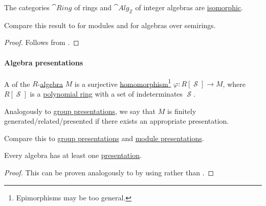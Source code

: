 \begin{proposition}\label{thm:ring_is_integer_algebra}
  The categories \( \hyperref[def:ring/category]{\cat{Ring}} \) of rings and \( \hyperref[def:algebra_over_ring/category]{\cat{Alg}_\BbbZ} \) of integer algebras are \hyperref[rem:category_similarity/isomorphism]{isomorphic}.
\end{proposition}
\begin{comments}
  \item Compare this result to  for modules and  for algebras over semirings.
\end{comments}
\begin{proof}
  Follows from .
\end{proof}

\paragraph{Algebra presentations}

\begin{definition}\label{def:algebra_presentation}
  A  of the \( R \)-\hyperref[def:algebra]{algebra} \( M \) is a surjective \hyperref[def:module/homomorphism]{homomorphism}\footnote{Epimorphisms may be too general.} \( \varphi: R[\mscrS] \to M \), where \( R[\mscrS] \) is a \hyperref[def:polynomial_algebra]{polynomial ring} with a set of indeterminates \( \mscrS \).

  Analogously to \hyperref[def:group_presentation]{group presentations}, we say that \( M \) is finitely generated/related/presented if there exists an appropriate presentation.
\end{definition}
\begin{comments}
  \item Compare this to \hyperref[def:group_presentation]{group presentations} and \hyperref[def:module_presentation]{module presentations}.
\end{comments}

\begin{proposition}\label{thm:algebra_presentation_existence}
  Every algebra has at least one \hyperref[def:algebra_presentation]{presentation}.
\end{proposition}
\begin{proof}
  This can be proven analogously to  by using rather than .
\end{proof}

